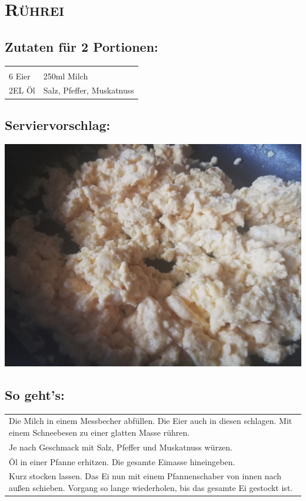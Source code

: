 \section{\textsc{Rührei}}

\subsection*{Zutaten für 2 Portionen:}

\begin{tabular}{p{7.5cm} p{7.5cm}}
	& \\
	6 Eier & 250ml Milch \\
	2EL Öl & Salz, Pfeffer, Muskatnuss
\end{tabular}

\subsection*{Serviervorschlag:}

\includegraphics[width=\textwidth]{img/ruehrei/ruehrei_fertig.jpg} \cite{ruehrei}

\subsection*{So geht's:}

\begin{tabular}{p{15cm}}
	\\
	Die Milch in einem Messbecher abfüllen. Die Eier auch in diesen schlagen. Mit einem Schneebesen zu einer glatten Masse rühren.\\
	Je nach Geschmack mit Salz, Pfeffer und Muskatnuss würzen.\\
	Öl in einer Pfanne erhitzen. Die gesamte Eimasse hineingeben.\\
	Kurz stocken lassen. Das Ei nun mit einem Pfannenschaber von innen nach außen schieben. Vorgang so lange wiederholen, bis das gesamte Ei gestockt ist.
\end{tabular}
